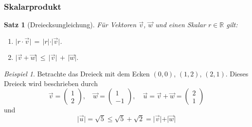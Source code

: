 \documentclass[hyperref={pdfpagelabels=false}]{beamer}
\theoremstyle{plain}%
\newtheorem*{satz}{Satz}
\theoremstyle{definition}
\theoremstyle{remark}
\newtheorem*{beispiel}{Beispiel}
\newcommand{\vektor}[1]{\overrightarrow{#1}}
\begin{document}
\begin{frame}
\frametitle{Skalarprodukt}

\begin{satz}[Dreiecksungleichung]\label{uvr_dreiecks_ungleichung} 
 Für Vektoren $\vektor{v}$, $\vektor{w}$ und einen Skalar $r \in \mathbb R$ gilt:

\begin{enumerate}
\item<2-> $\vert r \cdot \vektor{v} \vert \, = \, \vert r \vert \cdot \vert \vektor{v} \vert$.
\item<3-> $\vert \vektor{v} + \vektor{w} \vert \, \leq \, \vert \vektor{v} \vert \, + \, \vert \vektor{w} \vert$.
\end{enumerate}
\end{satz}

\pause \pause \pause 

\begin{beispiel}
Betrachte das Dreieck mit dem Ecken $(0,0)$, $(1,2)$, $(2,1)$. Dieses Dreieck wird beschrieben durch 
	$$ \vektor{v} = \begin{pmatrix} 1 \\ 2 \end{pmatrix}, \quad \vektor{w} = \begin{pmatrix} 1 \\ -1 \end{pmatrix}, 
	\quad \vektor{u} = \vektor{v} + \vektor{w} = \begin{pmatrix} 2 \\ 1 \end{pmatrix} $$
und 
	$$ \vert \vektor{u} \vert  = \sqrt{5} \leq \sqrt{5} + \sqrt{2} =  \vert \vektor{v} \vert +  \vert \vektor{w} \vert $$
\end{beispiel}

\end{frame}
\end{document}

